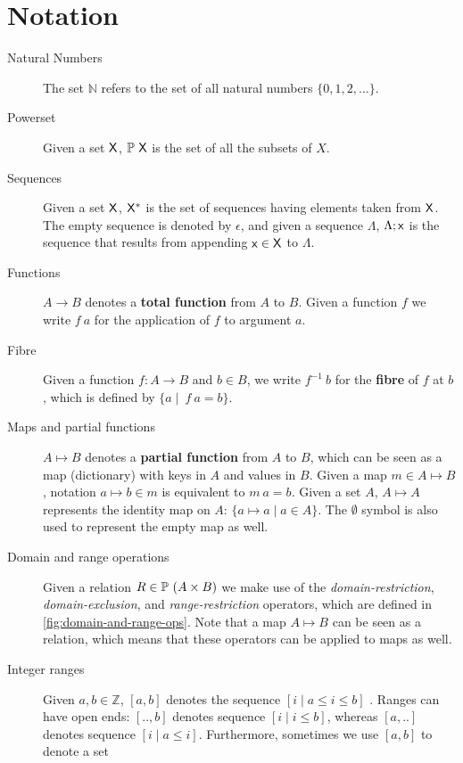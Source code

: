 \section{Notation}\label{sec:notation}

\begin{description}
\item[Natural Numbers] The set $\mathbb{N}$ refers to the set of all natural
  numbers $\{0, 1, 2, \ldots\}$.
\item[Powerset] Given a set $\mathsf{X}$, $\mathbb{P}~\mathsf{X}$ is the set of all
  the subsets of $X$.
\item[Sequences] Given a set $\mathsf{X}$, $\mathsf{X}^{*}$ is the set of
  sequences having elements taken from $\mathsf{X}$. The empty sequence is
  denoted by $\epsilon$, and given a sequence $\Lambda$, $\Lambda; \mathsf{x}$ is
  the sequence that results from appending $\mathsf{x} \in \mathsf{X}$ to
  $\Lambda$.
\item[Functions] $A \to B$ denotes a \textbf{total function} from $A$ to $B$.
  Given a function $f$ we write $f~a$ for the application of $f$ to argument
  $a$.
\item[Fibre] Given a function $f: A \to B$ and $b\in B$, we write
  $f^{-1}~b$ for the \textbf{fibre} of $f$ at $b$, which is defined by
  $\{a \mid\ f~ a =  b\}$.
\item[Maps and partial functions] $A \mapsto B$ denotes a \textbf{partial
    function} from $A$ to $B$, which can be seen as a map (dictionary) with
  keys in $A$ and values in $B$. Given a map $m \in A \mapsto B$, notation
  $a \mapsto b \in m$ is equivalent to $m~ a = b$. Given a set $A$,
  $A \mapsto A$ represents the identity map on $A$:
  $\{a \mapsto a \mid a \in A\}$. The $\emptyset$ symbol is also used to
  represent the empty map as well.
\item[Domain and range operations] Given a relation
  $R \in \mathbb{P}~(A \times B)$ we make use of the \textit{domain-restriction},
  \textit{domain-exclusion}, and \textit{range-restriction} operators, which
  are defined in \cref{fig:domain-and-range-ops}. Note that a map $A \mapsto B$
  can be seen as a relation, which means that these operators can be
  applied to maps as well.
\item[Integer ranges] Given $a, b \in \mathbb{Z}$, $[a, b]$ denotes the
  sequence $[i \mid a \leq i \leq b]$ . Ranges can have open ends: $[.., b]$
  denotes sequence $[i \mid i \leq b]$, whereas $[a, ..]$ denotes sequence
  $[i \mid a \leq i]$. Furthermore, sometimes we use $[a, b]$ to denote a set

\end{description}
